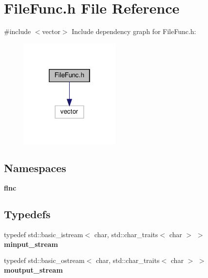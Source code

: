 \section{File\+Func.\+h File Reference}
\label{_file_func_8h}
{\ttfamily \#include $<$vector$>$}\newline
Include dependency graph for File\+Func.\+h\+:\nopagebreak
\begin{figure}[H]
\begin{center}
\leavevmode
\includegraphics[width=142pt]{_file_func_8h__incl}
\end{center}
\end{figure}
\subsection*{Namespaces}
\begin{DoxyCompactItemize}
\item 
 \textbf{ flnc}
\end{DoxyCompactItemize}
\subsection*{Typedefs}
\begin{DoxyCompactItemize}
\item 
typedef std\+::basic\+\_\+istream$<$ char, std\+::char\+\_\+traits$<$ char $>$ $>$ \textbf{ minput\+\_\+stream}
\item 
typedef std\+::basic\+\_\+ostream$<$ char, std\+::char\+\_\+traits$<$ char $>$ $>$ \textbf{ moutput\+\_\+stream}
\end{DoxyCompactItemize}
